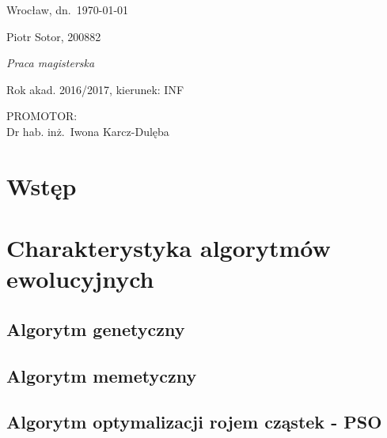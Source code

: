 \documentclass[a4paper,11pt]{article}
\begin{document}
\renewcommand*{\listtablename}{Spis tabel}
\thispagestyle{empty}
\noindent
\hfill Wrocław, dn.\ \today\\

\noindent
\begin{minipage}[c]{0.4\columnwidth}
  Piotr Sotor, 200882
\end{minipage}

\vspace{3cm}
\begin{center}
  \begin{LARGE}
    \emph{Praca magisterska} \\
  \end{LARGE}
\end{center}

\begin{center}
  Rok akad. 2016/2017, kierunek: INF
\end{center}
\vspace{0.1ex}
\begin{flushright}
\begin{minipage}[t]{0.4\columnwidth}
\noindent
PROMOTOR:\\
Dr hab. inż.~Iwona Karcz-Dulęba
\end{minipage}
\end{flushright}

\newpage
\tableofcontents

\newpage
\section{Wstęp}

\newpage
\section{Charakterystyka algorytmów ewolucyjnych}

\subsection{Algorytm genetyczny}

\subsection{Algorytm memetyczny}

\subsection{Algorytm optymalizacji rojem cząstek - PSO}
\end{document}
